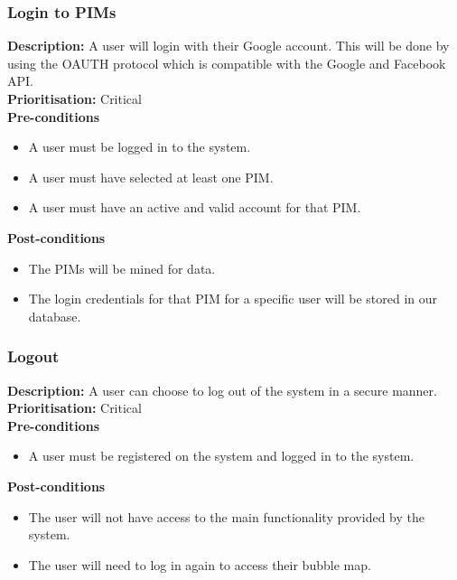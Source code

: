 \documentclass[hidelinks,english]{article}
\begin{document}
    		\subsubsection{Login to PIMs}
				\textbf{Description:}  A user will login with their Google account. This will be done by using the OAUTH protocol which is compatible with the Google and Facebook API.\\
    			\textbf{Prioritisation:} Critical\\
      			\textbf{Pre-conditions}
    			\begin{itemize}
        			\item A user must be logged in to the system.
        			\item A user must have selected at least one PIM.
        			\item A user must have an active and valid account for that PIM.
    			\end{itemize}
    			\textbf{Post-conditions}
     			\begin{itemize}
        			\item The PIMs will be mined for data.
        			\item The login credentials for that PIM for a specific user will be stored in our database.
    			\end{itemize}
    			
    		\subsubsection{Logout}
				\textbf{Description:}  A user can choose to log out of the system in a secure manner.\\
    			\textbf{Prioritisation:} Critical\\
      			\textbf{Pre-conditions}
    			\begin{itemize}
        			\item A user must be registered on the system and logged in to the system.
    			\end{itemize}
    			\textbf{Post-conditions}
     			\begin{itemize}
        			\item The user will not have access to the main functionality provided by the system.
        			\item The user will need to log in again to access their bubble map.
    			\end{itemize}
    			
\end{document}
